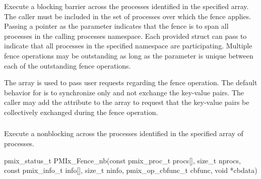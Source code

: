 Execute a blocking barrier across the processes identified in the specified array.
The caller must be included in the set of processes over which the fence applies.
Passing a  pointer as the  parameter indicates that the fence is to span all processes in the calling processes namespace.
Each provided  struct can pass  to indicate that all processes in the specified namespace are participating.
Multiple fence operations may be outstanding as long as the  parameter is unique between each of the outstanding fence operations.

The  array is used to pass user requests regarding the fence operation.
The default behavior for  is to synchronize only and not exchange the key-value pairs.
The caller may add the  attribute to the  array to request that the key-value pairs be collectively exchanged during the fence operation.


\subsubsection{}

\summary

Execute a nonblocking  across the processes identified in the specified array of processes.

\format

\cspecificstart
\begin{codepar}
pmix_status_t
PMIx_Fence_nb(const pmix_proc_t procs[], size_t nprocs,
              const pmix_info_t info[], size_t ninfo,
              pmix_op_cbfunc_t cbfunc, void *cbdata)
\end{codepar}
\cspecificend

\begin{arglist}
\end{arglist}

